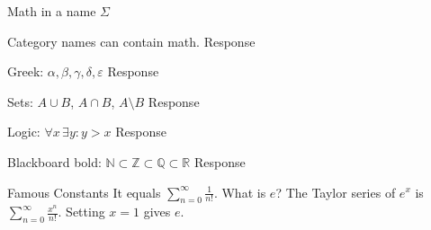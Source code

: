 \documentclass{article}
\newcommand{\R}{\mathbb{R}}
\begin{document}
\begin{category}{Math in a name $\Sigma$}
  \begin{clue}
    Category names can contain math.
  \response
    Response
  \end{clue}
  \begin{clue}
    Greek: $\alpha, \beta, \gamma, \delta, \varepsilon$
  \response
    Response
  \end{clue}
  \begin{clue}
    Sets: $A \cup B$, $A \cap B$, $A \setminus B$
  \response
    Response
  \end{clue}
  \begin{clue}
    Logic: $\forall x\, \exists y : y > x$
  \response
    Response
  \end{clue}
  \begin{clue}
    Blackboard bold: $\mathbb{N} \subset \mathbb{Z} \subset \mathbb{Q} \subset \R$
  \response
    Response
  \end{clue}
\end{category}

\begin{final}{Famous Constants}
  It equals $\displaystyle\sum_{n=0}^{\infty} \frac{1}{n!}$.
\response
  What is $e$?
\solution
  The Taylor series of $e^x$ is $\displaystyle\sum_{n=0}^{\infty} \frac{x^n}{n!}$.
  Setting $x = 1$ gives $e$.
\end{final}
\end{document}

